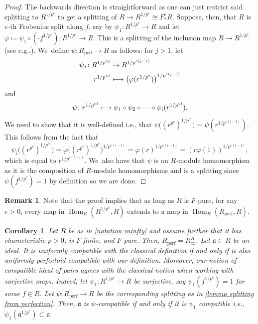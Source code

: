 \documentclass[11pt]{article}
\newcommand{\ie}{i.e.,\xspace}
\newcommand{\eg}{e.g.,\xspace}
\let\autoref\cref
\newcommand\mto{\mathchoice{\longmapsto}{\mapsto}{\mapsto}{\mapsto}}
\theoremstyle{plain}
\newtheorem{corollary}[theorem]{Corollary}
\theoremstyle{definition}
\newtheorem{remark}[theorem]{Remark}
\numberwithin{equation}{theorem}
\newcommand{\fra}{\mathfrak{a}}
\DeclareMathOperator{\Hom}{Hom}
\newcommand{\perf}{_{\mathrm{perf}}}
\newcommand{\unpe}{{1/{p^e}}}
\newcommand{\fe}{F^e}
\newcommand{\fstare}{\fe_*}
\renewcommand{\phi}{\varphi}
\newcommand{\rafty}{R^A_\infty}
\begin{document}
\begin{proof}
The backwards direction is straightforward as one can just restrict said splitting to $R^\unpe$ to get a splitting of $R\to R^\unpe\cong \fstare R$. Suppose, then, that $R$ is $e$-th Frobenius split along $f$, say by $\psi_1\colon R^\unpe\to R$ and let $\phi\coloneqq\psi_1\circ \left(\cdot f^\unpe\right)\colon R^\unpe\to R$. This is a splitting of the inclusion map $R\to R^\unpe$ (see \eg \cite[Prop.\,1.4.6]{SchwedeSmithFSingularitiesBook}). We~define $\psi\colon R\perf\to R$ as follows: for $j>1$, let
\begin{align*}
\psi_j \colon R^{1/p^{ej}} &\to R^{1/p^{e(j-1)}} \\
r^{1/p^{ej}} &\mto \bigl(\phi(r^\unpe)\bigr)^{1/p^{e(j-1)}}
\end{align*}
and
\[\psi \colon r^{1/p^{ei}} \mto \psi_1\circ \psi_2\circ\cdots\circ \psi_i(r^{1/p^{ei}}).
\]
We need to show that it is well-defined \ie that $\psi\bigl((r^{p^e})^{1/p^{ei}}\bigr)=\psi(r^{1/p^{e(i-1)}})$. This follows from the fact that
\[
\psi_i\bigl((r^{p^e})^{1/p^{ei}}\bigr)=\phi\bigl((r^{p^e})^{1/p^{e}}\bigr)^{1/p^{e(i-1)}}=\phi(r)^{1/p^{e(i-1)}}=(r\phi(1))^{1/p^{e(i-1)}},
\]
which is equal to $r^{1/p^{e(i-1)}}$. We~also have that $\psi$ is an $R$\nobreakdash-module homomorphism as it is the composition of $R$\nobreakdash-module homomorphisms and is a splitting since $\psi(f^\unpe)=1$ by definition so we are done.
\end{proof}
\begin{remark}
Note that the proof implies that as long as $R$ is $F$-pure, for any $e>0$, every map in $\Hom_R(R^\unpe,R)$ extends to a map in $\Hom_R(R\perf,R)$.
\end{remark}

\begin{corollary}\label{corollary equiv comp with char p}
Let $R$ be as in \autoref{notation rainfty} and assume further that it has characteristic $p>0$, is $F$-finite, and $F$-pure. Then, $R\perf=\rafty$. Let $\fra\subset R$ be an ideal. It is uniformly compatible with the classical definition if and only if is also uniformly perfectoid compatible with our definition. Moreover, our notion of compatible ideal of pairs agrees with the classical notion when working with surjective maps. Indeed,
let $\psi_1\colon R^\unpe\to R$ be surjective, say $\psi_1(f^\unpe)=1$ for some $f\in R$. Let $\psi\colon R\perf\to R$ be the corresponding splitting as in \autoref{lemma splitting from perfection}. Then, $\fra$ is $\psi$-compatible if and only if it is $\psi_1$ compatible \ie $\psi_1(\fra^\unpe)\subset \fra$.
\end{corollary}
\end{document}
